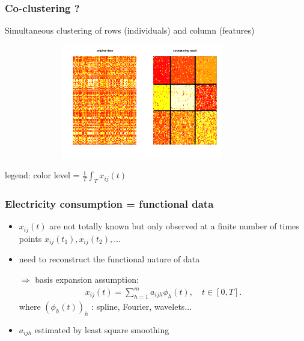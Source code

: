 \documentclass[10pt]{beamer}
\def\relief#1{{\color{blue} {#1}}}
\begin{document}


\begin{frame}
\frametitle{Co-clustering ?}
Simultaneous clustering of rows (individuals) and column (features)
\begin{figure}[h]
\centerline{
\includegraphics[height=5cm,width=10cm,angle=0]{images/Simul1-data.pdf}
}
\end{figure}
\vspace{-1cm}
legend: color level = $\frac{1}{T}\int_{T}x_{ij}(t)$
\end{frame}

\begin{frame}
\frametitle{Electricity consumption = functional data}
\begin{itemize}
\item $x_{ij}(t)$ are not totally known but only observed at a finite number of times points $x_{ij}(t_1),x_{ij}(t_2),\ldots$
\item need to reconstruct the functional nature of data
\item[$\Rightarrow$] basis expansion assumption: 
\begin{eqnarray*}
x_{ij}(t)=\sum_{h=1}^{m}a_{ijh}\phi_{h}(t), \quad t\in[0,T].
\end{eqnarray*}
where $(\phi_{h}(t))_h$ : spline, Fourier, wavelets...
\item $a_{ijh}$ estimated by least square smoothing
\end{itemize}
\end{frame}
\end{document}
